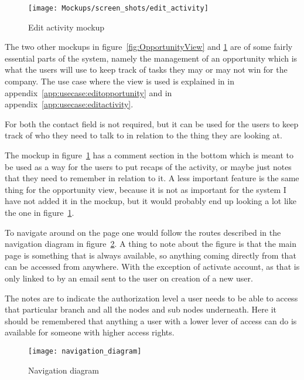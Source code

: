 \begin{figure}[!htb]
  \centering
  \texttt{[image: Mockups/screen\_shots/edit\_activity]}
  \caption{Edit activity mockup}
  \label{fig:ActivityView}
\end{figure}

The two other mockups in figure~\ref{fig:OpportunityView} and
\ref{fig:ActivityView} are of some fairly essential parts of the system, namely
the management of an opportunity which is what the users will use to keep track
of tasks they may or may not win for the company. The use case where the view is
used is explained in  in
appendix~\ref{app:usecase:editopportunity} and
 in appendix~\ref{app:usecase:editactivity}.


For both the contact field is
not required, but it can be used for the users to keep track of who they need to
talk to in relation to the thing they are looking at.

The mockup in figure~\ref{fig:ActivityView} has a comment section in the bottom
which is meant to be used as a way for the users to put recaps of the activity,
or maybe just notes that they need to remember in relation to it. A less
important feature is the same thing for the opportunity view, because it is not
as important for the system I have not added it in the mockup, but it would
probably end up looking a lot like the one in figure~\ref{fig:ActivityView}. 

To navigate around on the page one would follow the routes described in the
navigation diagram in figure~\ref{fig:navigation_diagram}. A thing to note about
the figure is that the main page is something that is always available, so
anything coming directly from that can be accessed from anywhere. With the
exception of activate account, as that is only linked to by an email sent to the
user on creation of a new user.

The notes are to indicate the authorization level a user needs to be able to
access that particular branch and all the nodes and sub nodes underneath. Here
it should be remembered that anything a user with a lower lever of access can do
is available for someone with higher access rights.

\begin{figure}[!htb]
  \centering
  \texttt{[image: navigation\_diagram]}
  \caption{Navigation diagram}
  \label{fig:navigation_diagram}
\end{figure}


